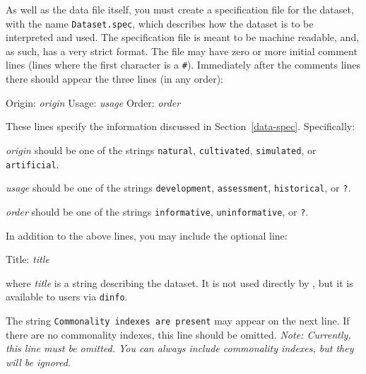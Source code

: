 As well as the data file itself, you must create a specification file
for the dataset, with the name \texttt{Dataset.spec}, which describes how the
dataset is to be interpreted and used.  The specification file is
meant to be machine readable, and, as such, has a very strict format.
The file may have zero or more initial comment lines (lines where the
first character is a \verb+#+).  Immediately after the comments lines
there should appear the three lines (in any order):\vspace{-5pt}
\begin{Session}
Origin: {\rm \em origin}
Usage:  {\rm \em usage}
Order:  {\rm \em order}
\end{Session}\vspace{-5pt}
These lines specify the information discussed in Section~\ref{data-spec}.
Specifically:\vspace{-5pt}
\begin{list}{}{%
\setlength{\leftmargin}{0.9in}%
\setlength{\labelwidth}{0.5in}%
\setlength{\labelsep}{0.18in}}
\item[{\em origin\hfill}]
    should be one of the strings \texttt{natural},
    \texttt{cultivated}, \texttt{simulated}, or 
    \texttt{artificial}.\vspace{-2pt}
\item[{\em usage\hfill}]
    should be one of the strings \texttt{development},
    \texttt{assessment}, \texttt{historical}, or \texttt{?}.\vspace{-2pt}
\item[{\em order\hfill}]
    should be one of the strings \texttt{informative},
    \texttt{uninformative}, or \texttt{?}.\vspace{-5pt}
\end{list}\vspace{-5pt}
In addition to the above lines, you may include the optional line:
\begin{Session}
Title: {\rm \em title}
\end{Session}\vspace{-5pt}
where \textit{title} is a string describing the dataset.  It is not
used directly by \delve{}, but it is available to users via \texttt{dinfo}.

The string \texttt{Commonality indexes are present} may appear on the next
line.  If there are no commonality indexes, this line should be omitted.
{\em Note: Currently, this line must be omitted.  You can always include
commonality indexes, but they will be ignored.}

